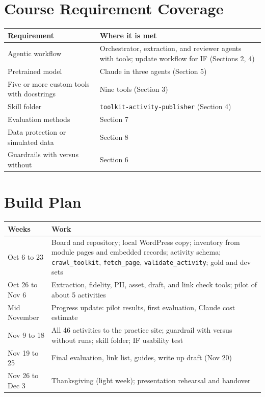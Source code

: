 \section{Course Requirement Coverage}
\begin{tabularx}{\textwidth}{@{}P{5.6cm}L@{}}
\toprule
\textbf{Requirement} & \textbf{Where it is met} \\
\midrule
Agentic workflow & Orchestrator, extraction, and reviewer agents with tools; update workflow for IF (Sections 2, 4) \\
Pretrained model & Claude in three agents (Section 5) \\
Five or more custom tools with docstrings & Nine tools (Section 3) \\
Skill folder & \texttt{toolkit-activity-publisher} (Section 4) \\
Evaluation methods & Section 7 \\
Data protection or simulated data & Section 8 \\
Guardrails with versus without & Section 6 \\
\bottomrule
\end{tabularx}

\section{Build Plan}
\begin{tabularx}{\textwidth}{@{}P{3cm}L@{}}
\toprule
\textbf{Weeks} & \textbf{Work} \\
\midrule
Oct 6 to 23 & Board and repository; local WordPress copy; inventory from module pages and embedded records; activity schema; \texttt{crawl\_toolkit}, \texttt{fetch\_page}, \texttt{validate\_activity}; gold and dev sets \\
Oct 26 to Nov 6 & Extraction, fidelity, PII, asset, draft, and link check tools; pilot of about 5 activities \\
Mid November & Progress update: pilot results, first evaluation, Claude cost estimate \\
Nov 9 to 18 & All 46 activities to the practice site; guardrail with versus without runs; skill folder; IF usability test \\
Nov 19 to 25 & Final evaluation, link list, guides, write up draft (Nov 20) \\
Nov 26 to Dec 3 & Thanksgiving (light week); presentation rehearsal and handover \\
\bottomrule
\end{tabularx}

